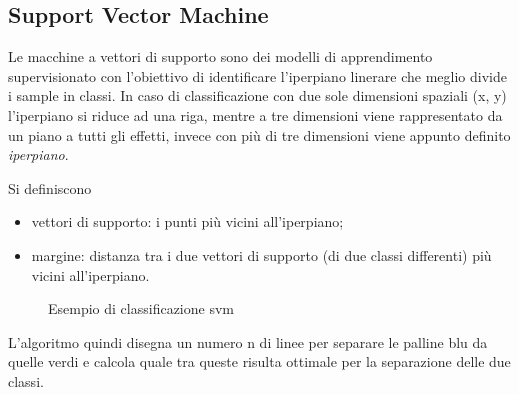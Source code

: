 \documentclass[12pt,a4paper]{article}
\begin{document}
\subsection{Support Vector Machine}
Le macchine a vettori di supporto sono dei modelli di apprendimento supervisionato con l'obiettivo di identificare l'iperpiano linerare che meglio divide i sample in classi. In caso di classificazione con due sole dimensioni spaziali (x, y) l'iperpiano si riduce ad una riga, mentre a tre dimensioni viene rappresentato da un piano a tutti gli effetti, invece con più di tre dimensioni viene appunto definito \textit{iperpiano}.

Si definiscono
\begin{itemize}
    \item vettori di supporto: i punti più vicini all'iperpiano;
    \item margine: distanza tra i due vettori di supporto (di due classi differenti) più vicini all'iperpiano.
\end{itemize}

\begin{figure}[H]
    \centering
    \caption{Esempio di classificazione svm}
\end{figure}



L'algoritmo quindi disegna un numero n di linee per separare le palline blu da quelle verdi e calcola quale tra queste risulta ottimale per la separazione delle due classi.
\end{document}
